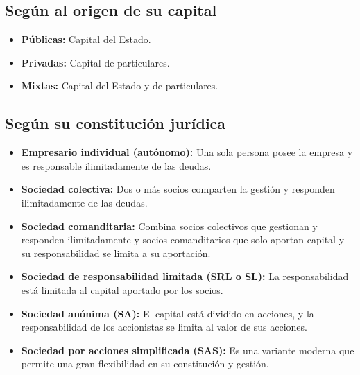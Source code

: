 \documentclass{templateNote}
\begin{document}
\subsection{Seg\'un al origen de su capital}
\begin{itemize}
    \item \textbf{P\'ublicas:} Capital del Estado.
    
    \item \textbf{Privadas:} Capital de particulares.
    
    \item \textbf{Mixtas:} Capital del Estado y de particulares.
\end{itemize}

\subsection{Seg\'un su constituci\'on jur\'idica}
\begin{itemize}
    \item \textbf{Empresario individual (autónomo):} Una sola persona posee la empresa y es responsable ilimitadamente de las deudas.
    
    \item \textbf{Sociedad colectiva:} Dos o más socios comparten la gestión y responden \newline ilimitadamente de las deudas.
    
    \item \textbf{Sociedad comanditaria:} Combina socios colectivos que gestionan y responden ilimitadamente y socios comanditarios que solo aportan capital y su responsabilidad se limita a su aportación.
    
    \item \textbf{Sociedad de responsabilidad limitada (SRL o SL):} La responsabilidad está limitada al capital aportado por los socios.
    
    \item \textbf{Sociedad anónima (SA):} El capital está dividido en acciones, y la responsabilidad de los accionistas se limita al valor de sus acciones.
    
    \item \textbf{Sociedad por acciones simplificada (SAS):} Es una variante moderna que permite una gran flexibilidad en su constitución y gestión.
\end{itemize}
\end{document}
